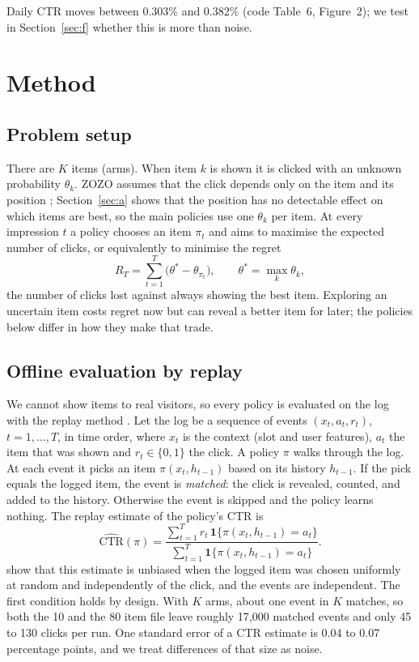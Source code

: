 \documentclass[11pt]{article}
\begin{document}
Daily CTR moves between 0.303\% and 0.382\% (code Table~6, Figure~2); we test
in Section~\ref{sec:f} whether this is more than noise.

\section{Method}

\subsection{Problem setup}

There are $K$ items (arms). When item $k$ is shown it is clicked with an
unknown probability $\theta_k$. ZOZO assumes that the click depends only on
the item and its position \citep{saito2021}; Section~\ref{sec:a} shows that
the position has no detectable effect on which items are best, so the main
policies use one $\theta_k$ per item. At every impression $t$ a policy
chooses an item $\pi_t$ and aims to maximise the expected number of clicks, or
equivalently to minimise the regret
%
\begin{equation}
  R_T = \sum_{t=1}^{T} \big(\theta^{*} - \theta_{\pi_t}\big),
  \qquad \theta^{*} = \max_k \theta_k ,
  \label{eq:regret}
\end{equation}
%
the number of clicks lost against always showing the best item. Exploring
an uncertain item costs regret now but can reveal a better item for later;
the policies below differ in how they make that trade.

\subsection{Offline evaluation by replay}
\label{sec:replay}

We cannot show items to real visitors, so every policy is evaluated on the
log with the replay method \citep{li2011}. Let the log be a sequence of
events $(x_t, a_t, r_t)$, $t = 1,\dots,T$, in time order, where $x_t$ is the
context (slot and user features), $a_t$ the item that was shown and
$r_t \in \{0,1\}$ the click. A policy $\pi$ walks through the log. At each
event it picks an item $\pi(x_t, h_{t-1})$ based on its history $h_{t-1}$. If
the pick equals the logged item, the event is \emph{matched}: the click is
revealed, counted, and added to the history. Otherwise the event is skipped
and the policy learns nothing. The replay estimate of the policy's CTR is
%
\begin{equation}
  \widehat{\text{CTR}}(\pi)
  = \frac{\sum_{t=1}^{T} r_t \,\mathbf{1}\{\pi(x_t,h_{t-1}) = a_t\}}
         {\sum_{t=1}^{T} \mathbf{1}\{\pi(x_t,h_{t-1}) = a_t\}} .
  \label{eq:replay}
\end{equation}
%
\citet{li2011} show that this estimate is unbiased when the logged item was
chosen uniformly at random and independently of the click, and the events are
independent. The first condition holds by design. With $K$ arms, about one
event in $K$ matches, so both the 10 and the 80 item file leave roughly
17{,}000 matched events and only 45 to 130 clicks per run. One standard error
of a CTR estimate is 0.04 to 0.07 percentage points, and we treat differences
of that size as noise.
\end{document}
